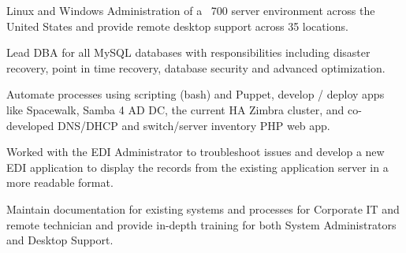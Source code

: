 \documentclass[letterpaper]{deedy-resume} %
\begin{document}
\begin{minipage}[t]{0.66\textwidth}
\begin{tightitemize}
\item Linux and Windows Administration of a ~700 server environment across the United States and provide remote desktop support across 35 locations. 
\item Lead DBA for all MySQL databases with responsibilities including disaster recovery, point in time recovery, database security and advanced optimization. 
\item Automate processes using scripting (bash) and Puppet, develop / deploy apps like Spacewalk, Samba 4 AD DC, the current HA Zimbra cluster, and co-developed DNS/DHCP and switch/server inventory PHP web app. 
\item Worked with the EDI Administrator to troubleshoot issues and develop a new EDI application to display the records from the existing application server in a more readable format.
\item Maintain documentation for existing systems and processes for Corporate IT and remote technician and provide in-depth training for both System Administrators and Desktop Support. 
\end{tightitemize}


\end{minipage} %


\newpage
\end{document}
